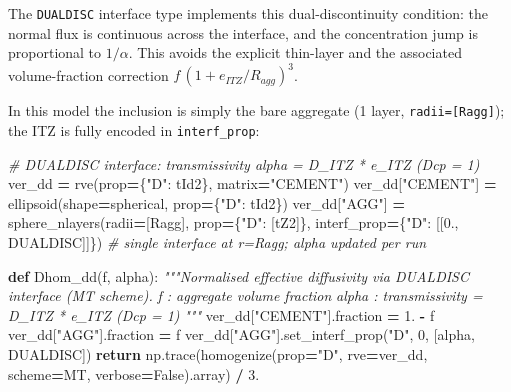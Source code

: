\documentclass[
  a4paper,
  numbers=noendperiod,
  DIV=12]{scrreprt}
\newenvironment{Shaded}{\begin{snugshade}}{\end{snugshade}}
\newcommand{\CommentTok}[1]{\textcolor[rgb]{0.56,0.35,0.01}{\textit{#1}}}
\newcommand{\ControlFlowTok}[1]{\textcolor[rgb]{0.13,0.29,0.53}{\textbf{#1}}}
\newcommand{\DecValTok}[1]{\textcolor[rgb]{0.00,0.00,0.81}{#1}}
\newcommand{\FloatTok}[1]{\textcolor[rgb]{0.00,0.00,0.81}{#1}}
\newcommand{\KeywordTok}[1]{\textcolor[rgb]{0.13,0.29,0.53}{\textbf{#1}}}
\newcommand{\NormalTok}[1]{#1}
\newcommand{\OperatorTok}[1]{\textcolor[rgb]{0.81,0.36,0.00}{\textbf{#1}}}
\newcommand{\StringTok}[1]{\textcolor[rgb]{0.31,0.60,0.02}{#1}}
\newcommand{\VariableTok}[1]{\textcolor[rgb]{0.00,0.00,0.00}{#1}}
\begin{document}
The \texttt{DUALDISC} interface type implements this dual-discontinuity
condition: the normal flux is continuous across the interface, and the
concentration jump is proportional to \(1/\alpha\). This avoids the
explicit thin-layer and the associated volume-fraction correction
\(f\,(1+e_{ITZ}/R_{agg})^3\).

In this model the inclusion is simply the bare aggregate (1 layer,
\texttt{radii={[}Ragg{]}}); the ITZ is fully encoded in
\texttt{interf\_prop}:

\begin{Shaded}
\begin{Highlighting}[]
\CommentTok{\# DUALDISC interface: transmissivity alpha = D\_ITZ * e\_ITZ  (Dcp = 1)}
\NormalTok{ver\_dd }\OperatorTok{=}\NormalTok{ rve(prop}\OperatorTok{=}\NormalTok{\{}\StringTok{"D"}\NormalTok{: tId2\}, matrix}\OperatorTok{=}\StringTok{"CEMENT"}\NormalTok{)}
\NormalTok{ver\_dd[}\StringTok{"CEMENT"}\NormalTok{] }\OperatorTok{=}\NormalTok{ ellipsoid(shape}\OperatorTok{=}\NormalTok{spherical, prop}\OperatorTok{=}\NormalTok{\{}\StringTok{"D"}\NormalTok{: tId2\})}
\NormalTok{ver\_dd[}\StringTok{"AGG"}\NormalTok{]    }\OperatorTok{=}\NormalTok{ sphere\_nlayers(radii}\OperatorTok{=}\NormalTok{[Ragg], prop}\OperatorTok{=}\NormalTok{\{}\StringTok{"D"}\NormalTok{: [tZ2]\},}
\NormalTok{                                   interf\_prop}\OperatorTok{=}\NormalTok{\{}\StringTok{"D"}\NormalTok{: [[}\FloatTok{0.}\NormalTok{, DUALDISC]]\})}
\CommentTok{\# single interface at r=Ragg; alpha updated per run}

\KeywordTok{def}\NormalTok{ Dhom\_dd(f, alpha):}
    \CommentTok{"""Normalised effective diffusivity via DUALDISC interface (MT scheme).}
\CommentTok{    f     : aggregate volume fraction}
\CommentTok{    alpha : transmissivity = D\_ITZ * e\_ITZ  (Dcp = 1)}
\CommentTok{    """}
\NormalTok{    ver\_dd[}\StringTok{"CEMENT"}\NormalTok{].fraction }\OperatorTok{=} \FloatTok{1.} \OperatorTok{{-}}\NormalTok{ f}
\NormalTok{    ver\_dd[}\StringTok{"AGG"}\NormalTok{].fraction    }\OperatorTok{=}\NormalTok{ f}
\NormalTok{    ver\_dd[}\StringTok{"AGG"}\NormalTok{].set\_interf\_prop(}\StringTok{"D"}\NormalTok{, }\DecValTok{0}\NormalTok{, [alpha, DUALDISC])}
    \ControlFlowTok{return}\NormalTok{ np.trace(homogenize(prop}\OperatorTok{=}\StringTok{"D"}\NormalTok{, rve}\OperatorTok{=}\NormalTok{ver\_dd, scheme}\OperatorTok{=}\NormalTok{MT, verbose}\OperatorTok{=}\VariableTok{False}\NormalTok{).array) }\OperatorTok{/} \FloatTok{3.}
\end{Highlighting}
\end{Shaded}
\end{document}
